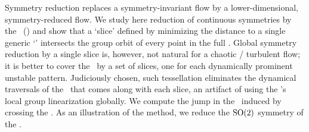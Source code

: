 
Symmetry reduction replaces a symmetry-invariant flow by a
lower-dimensional, symmetry-reduced flow. We study here reduction of
continuous symmetries by the \mslices\ (\mframes) and show that a `slice'
defined by minimizing the distance to a single generic `{\template}'
intersects the group orbit of every point in the full {\statesp}. Global
symmetry reduction by a single slice is, however, not natural for a
chaotic / turbulent flow; it is better to cover the \reducedsp\ by a set
of slices, one for each dynamically prominent unstable pattern.
Judiciously chosen, such tessellation eliminates the dynamical traversals
of the \sset\ that comes along with each slice, an artifact of using the
{\template}'s local group linearization globally. We compute the jump in
the \reducedsp\ induced by crossing the \sset. As an illustration of the
method, we reduce the $\textrm{SO}(2)$ symmetry of the \cLe.

%
